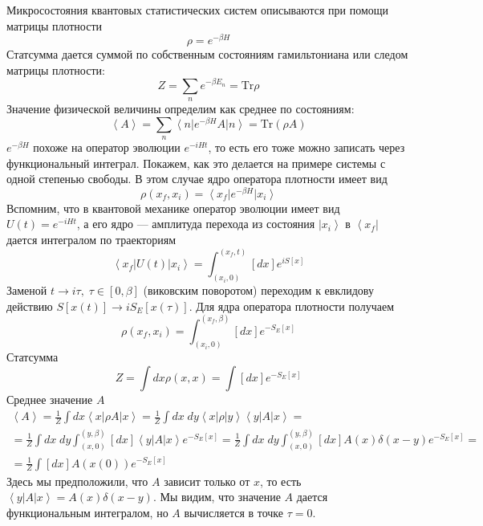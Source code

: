 \documentclass[a4paper,12pt]{article}
\theoremstyle{definition}
\theoremstyle{definition}
\theoremstyle{definition}
\begin{document}
Микросостояния квантовых статистических систем описываются при помощи матрицы плотности
\begin{equation}
  \label{eq:19}
  \rho=e^{-\beta H}
\end{equation}
Статсумма дается суммой по собственным состояниям гамильтониана или следом матрицы плотности:
\begin{equation}
  \label{eq:20}
  Z=\sum_n e^{-\beta E_n}=\mathrm{Tr} \rho
\end{equation}
Значение физической величины определим как среднее по состояниям:
\begin{equation}
  \label{eq:21}
  \left< A\right>=\sum_n \left< n\right| e^{-\beta H}A\left| n \right>=\mathrm{Tr}(\rho A)
\end{equation}
$e^{-\beta H}$ похоже на оператор эволюции $e^{-i H t}$, то есть его тоже можно записать через
функциональный интеграл. Покажем, как это делается на примере системы с одной степенью свободы. В
этом случае ядро оператора плотности имеет вид 
\begin{equation}
  \label{eq:22}
  \rho(x_f,x_i)=\left<x_f\right|e^{-\beta H} \left|x_i\right>
\end{equation}
Вспомним, что в квантовой механике оператор эволюции имеет вид $U(t)=e^{-i H t}$, а его ядро ---
амплитуда перехода из состояния $\left|x_i\right>$ в $\left<x_f\right|$ дается интегралом по
траекториям 
\begin{equation}
  \label{eq:23}
  \left<x_f\right| U(t)\left| x_i\right>=\int_{(x_i,0)}^{(x_f,t)} [dx] e^{i S[x]}
\end{equation}
Заменой $t\to i\tau, \; \tau\in [0,\beta]$ (виковским поворотом) переходим к евклидову действию
$S[x(t)]\to iS_E[x(\tau)]$. Для ядра оператора плотности получаем 
\begin{equation}
  \label{eq:24}
  \rho(x_f,x_i)=\int_{(x_i,0)}^{(x_f,\beta)} [dx] e^{-S_E[x]}
\end{equation}
Статсумма
\begin{equation}
  \label{eq:25}
  Z=\int dx \rho(x,x)=\int [dx] e^{-S_E[x]}
\end{equation}
Среднее значение $A$
\begin{equation}
  \label{eq:26}
  \begin{array}{l}
    \left<A\right>=\frac{1}{Z}\int dx \left<x\right|\rho A\left|x\right>=\frac{1}{Z}\int dx\; dy \left<x\right|\rho\left|y\right>\left<y\right|A\left|x\right>=    \\
    =\frac{1}{Z}\int dx\; dy \int_{(x,0)}^{(y,\beta)} [dx] \left<y\right| A\left| x\right> e^{-S_E[x]}=\frac{1}{Z}\int dx\; dy\int_{(x,0)}^{(y,\beta)} [dx] A(x) \delta(x-y) e^{-S_E[x]}=\\
    =\frac{1}{Z}\int [dx] A(x(0))e^{-S_E[x]}
  \end{array}
\end{equation}
Здесь мы предположили, что $A$ зависит только от $x$, то есть $\left<y\right|
A\left|x\right>=A(x)\delta(x-y)$. Мы видим, что значение $A$ дается функциональным интегралом, но
$A$ вычисляется в точке $\tau=0$.  
\end{document}
